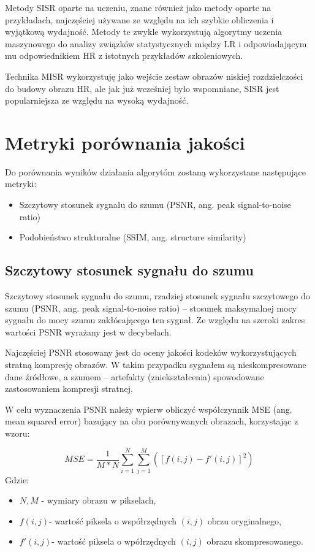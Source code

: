 \documentclass[a4paper,11pt, notitlepage ]{article}
\begin{document}
	 Metody SISR oparte na uczeniu, znane również jako metody oparte na przykładach, najczęściej używane ze względu na ich szybkie obliczenia i wyjątkową wydajność. Metody te zwykle wykorzystują algorytmy uczenia maszynowego do analizy związków statystycznych między LR i odpowiadającym mu odpowiednikiem HR z istotnych przykładów szkoleniowych.
	 
	 Technika MISR wykorzystuję jako wejście zestaw obrazów niskiej rozdzielczości do budowy obrazu HR, ale jak już wcześniej było wspomniane, SISR jest popularniejsza ze względu na wysoką wydajność.
	 \newpage
	 \section{Metryki porównania jakości}
	 Do porównania wyników działania algorytóm zostaną wykorzystane następujące metryki:
	 \begin{itemize}
	 	\item Szczytowy stosunek sygnału do szumu (PSNR, ang. peak signal-to-noise ratio)
	 	\item Podobieństwo strukturalne (SSIM, ang. structure similarity) 
	 \end{itemize}
 	\subsection{Szczytowy stosunek sygnału do szumu}
 	Szczytowy stosunek sygnału do szumu, rzadziej stosunek sygnału szczytowego do szumu (PSNR, ang. peak signal-to-noise ratio) – stosunek maksymalnej mocy sygnału do mocy szumu zakłócającego ten sygnał. Ze względu na szeroki zakres wartości PSNR wyrażany jest w decybelach. 
 	
 	Najczęściej PSNR stosowany jest do oceny jakości kodeków wykorzystujących stratną kompresję obrazów. W takim przypadku sygnałem są nieskompresowane dane źródłowe, a szumem – artefakty (zniekształcenia) spowodowane zastosowaniem kompresji stratnej.
 	
 	W celu wyznaczenia PSNR należy wpierw obliczyć współczynnik MSE (ang. mean squared error) bazujący na obu porównywanych obrazach, korzystając z wzoru:
 	
 	$$ MSE= \frac{1}{M*N} \sum_{i=1}^{N} \sum_{j=1}^{M} ([f(i,j)-f'(i,j)]^2)$$
 	Gdzie:
 	\begin{itemize}
 		\item $N,M$ - wymiary obrazu w pikselach,
 		\item $f(i,j)$- wartość piksela o współrzędnych $(i,j)$ obrzu oryginalnego,
 		\item $f'(i,j)$- wartość piksela o wpółrzędnych $(i,j)$ obrazu skompresowanego.
 	\end{itemize}
 
\end{document}
